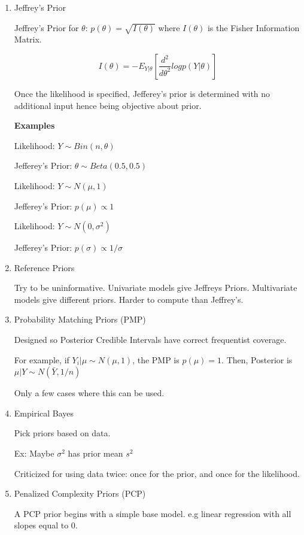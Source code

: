 \documentclass[11pt]{article}
\begin{document}
\begin{enumerate}
\item Jeffrey's Prior
\label{sec:org0d4f01f}

Jeffrey's Prior for \(\theta\): \(p(\theta) = \sqrt{I(\theta)}\) where \(I(\theta)\)
is the Fisher Information Matrix.


$$
I(\theta) = - E_{Y | \theta} [\frac{d^2}{d \theta^2} log p(Y | \theta)]
$$

Once the likelihood is specified, Jefferey's prior is determined with no
additional input hence being objective about prior.

\textbf{Examples}

Likelihood: \(Y \sim Bin(n, \theta)\)

Jefferey's Prior: \(\theta \sim Beta(0.5, 0.5)\)

Likelihood: \(Y \sim N(\mu, 1)\)

Jefferey's Prior: \(p(\mu) \propto 1\)

Likelihood: \(Y \sim N(0, \sigma^2)\)

Jefferey's Prior: \(p(\sigma) \propto 1/\sigma\)

\item Reference Priors
\label{sec:org4a94ecd}

Try to be uninformative. Univariate models give Jeffreys Priors. Multivariate
models give different priors. Harder to compute than Jeffrey's.

\item Probability Matching Priors (PMP)
\label{sec:org48fb642}

Designed so Posterior Credible Intervals have correct frequentist coverage.

For example, if \(Y_i | \mu \sim N(\mu, 1)\), the PMP is \(p(\mu) = 1\). Then, Posterior
is \(\mu | Y \sim N(\bar Y, 1 / n)\)

Only a few cases where this can be used.

\item Empirical Bayes
\label{sec:org14a470e}

Pick priors based on data.

Ex: Maybe \(\sigma^2\) has prior mean \(s^2\)

Criticized for using data twice: once for the prior, and once for the likelihood.

\item Penalized Complexity Priors (PCP)
\label{sec:org5ebcfda}

A PCP prior begins with a simple base model. e.g linear regression with all
slopes equal to 0.


\end{enumerate}
\end{document}
